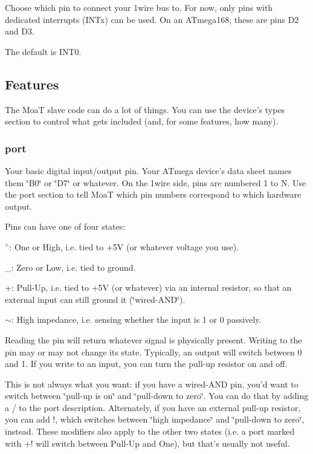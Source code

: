 Choose which pin to connect your 1wire bus to. For now, only pins with dedicated interrupts (I\-N\-Tx) can be used. On an A\-Tmega168, these are pins D2 and D3.

The default is I\-N\-T0.

\subsection*{Features}

The Moa\-T slave code can do a lot of things. You can use the device's {\ttfamily types} section to control what gets included (and, for some features, how many).

\subsubsection*{port}

Your basic digital input/output pin. Your A\-Tmega device's data sheet names them \char`\"{}\-B0\char`\"{} or \char`\"{}\-D7\char`\"{} or whatever. On the 1wire side, pins are numbered 1 to N. Use the {\ttfamily port} section to tell Moa\-T which pin numbers correspond to which hardware output.

Pins can have one of four states\-:


\begin{DoxyItemize}
\item {\ttfamily $^\wedge$}\-: One or High, i.\-e. tied to +5\-V (or whatever voltage you use).
\item {\ttfamily \-\_\-}\-: Zero or Low, i.\-e. tied to ground.
\item {\ttfamily +}\-: Pull-\/\-Up, i.\-e. tied to +5\-V (or whatever) via an internal resistor, so that an external input can still ground it (\char`\"{}wired-\/\-A\-N\-D\char`\"{}).
\item {\ttfamily $\sim$}\-: High impedance, i.\-e. sensing whether the input is 1 or 0 passively.
\end{DoxyItemize}

Reading the pin will return whatever signal is physically present. Writing to the pin may or may not change its state. Typically, an output will switch between 0 and 1. If you write to an input, you can turn the pull-\/up resistor on and off.

This is not always what you want\-: if you have a wired-\/\-A\-N\-D pin, you'd want to switch between \char`\"{}pull-\/up is on\char`\"{} and \char`\"{}pull-\/down to zero\char`\"{}. You can do that by adding a {\ttfamily /} to the port description. Alternately, if you have an external pull-\/up resistor, you can add {\ttfamily !}, which switches between \char`\"{}high
impedance\char`\"{} and \char`\"{}pull-\/down to zero\char`\"{}, instead. These modifiers also apply to the other two states (i.\-e. a port marked with {\ttfamily +!} will switch between Pull-\/\-Up and One), but that's usually not useful.

